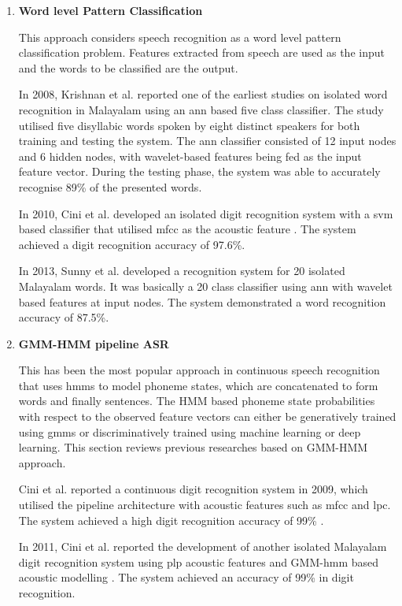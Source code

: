 \begin{enumerate}
    \item \textbf{Word level Pattern Classification}

    This approach considers speech recognition as a word level pattern classification problem. Features extracted from speech are used as the input and the words to be classified are the output.
    
    In 2008, Krishnan et al. \cite{krishnan_speech_2008} reported one of the earliest studies on isolated word recognition in Malayalam using an \gls{ann} based five class  classifier. The study utilised five disyllabic words spoken by eight distinct speakers for both training and testing the system. The \gls{ann} classifier consisted of 12 input nodes and 6 hidden nodes, with wavelet-based features being fed as the input feature vector. During the testing phase, the system was able to accurately recognise 89\% of the presented words. 

    
    In 2010, Cini et al. developed an isolated digit recognition system with a \gls{svm} based classifier that utilised \gls{mfcc} as the acoustic feature \cite{kurian2010isolated}. The system achieved a digit recognition accuracy of 97.6\%.
    
    
    In 2013, Sunny et al. \cite{sunny2012development} developed a recognition system for 20 isolated Malayalam words. It was basically a 20 class classifier using \gls{ann} with wavelet based features at input nodes. The system demonstrated a word recognition accuracy of 87.5\%.

    
    \item \textbf{GMM-HMM pipeline ASR}

    This has been the most popular approach in continuous speech recognition that uses \gls{hmm}s to model phoneme states, which are concatenated to form words and finally sentences. The HMM based phoneme state probabilities with respect to the observed feature vectors can either be generatively trained using \gls{gmm}s or discriminatively trained using machine learning or deep learning. This section reviews previous researches based on GMM-HMM approach.
    
    Cini et al. reported a continuous digit recognition system in 2009, which utilised the pipeline architecture with acoustic features such as \gls{mfcc} and \gls{lpc}. The system achieved a high digit recognition accuracy of 99\% \cite{kurian_speech_2009}.


     In 2011, Cini et al. reported the development of another isolated Malayalam digit recognition system using \gls{plp} acoustic features and GMM-\gls{hmm} based acoustic modelling \cite{kurian2011malayalam}.  The system achieved an accuracy of 99\% in digit recognition. 


\end{enumerate}
